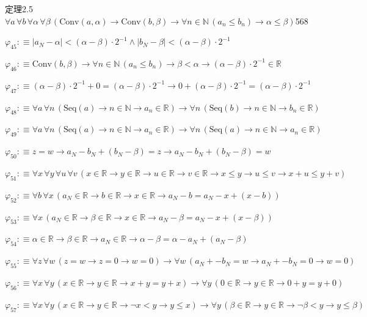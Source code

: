 \begin{fullproof}{定理2.5}{$\forall a\,\forall b\,\forall \alpha\,\forall \beta\,(\mathrm{Conv}(a,\alpha) \to \mathrm{Conv}(b,\beta) \to \forall n \in \mathbb{N}\,(a_{n} \leq b_{n}) \to \alpha \leq \beta)$}{568}
\begin{abbrevlist}
\item $\varphi_{45} :\equiv \lvert a_{N} - \alpha \rvert < (\alpha - \beta) \cdot 2^{-1} \land \lvert b_{N} - \beta \rvert < (\alpha - \beta) \cdot 2^{-1}$
\item $\varphi_{46} :\equiv \mathrm{Conv}(b,\beta) \to \forall n \in \mathbb{N}\,(a_{n} \leq b_{n}) \to \beta < \alpha \to (\alpha - \beta) \cdot 2^{-1} \in \mathbb{R}$
\item $\varphi_{47} :\equiv (\alpha - \beta) \cdot 2^{-1} + 0 = (\alpha - \beta) \cdot 2^{-1} \to 0 + (\alpha - \beta) \cdot 2^{-1} = (\alpha - \beta) \cdot 2^{-1}$
\item $\varphi_{48} :\equiv \forall a\,\forall n\,(\mathrm{Seq}(a) \to n \in \mathbb{N} \to a_{n} \in \mathbb{R}) \to \forall n\,(\mathrm{Seq}(b) \to n \in \mathbb{N} \to b_{n} \in \mathbb{R})$
\item $\varphi_{49} :\equiv \forall a\,\forall n\,(\mathrm{Seq}(a) \to n \in \mathbb{N} \to a_{n} \in \mathbb{R}) \to \forall n\,(\mathrm{Seq}(a) \to n \in \mathbb{N} \to a_{n} \in \mathbb{R})$
\item $\varphi_{50} :\equiv z = w \to a_{N} - b_{N} + (b_{N} - \beta) = z \to a_{N} - b_{N} + (b_{N} - \beta) = w$
\item $\varphi_{51} :\equiv \forall x\,\forall y\,\forall u\,\forall v\,(x \in \mathbb{R} \to y \in \mathbb{R} \to u \in \mathbb{R} \to v \in \mathbb{R} \to x \leq y \to u \leq v \to x + u \leq y + v)$
\item $\varphi_{52} :\equiv \forall b\,\forall x\,(a_{N} \in \mathbb{R} \to b \in \mathbb{R} \to x \in \mathbb{R} \to a_{N} - b = a_{N} - x + (x - b))$
\item $\varphi_{53} :\equiv \forall x\,(a_{N} \in \mathbb{R} \to \beta \in \mathbb{R} \to x \in \mathbb{R} \to a_{N} - \beta = a_{N} - x + (x - \beta))$
\item $\varphi_{54} :\equiv \alpha \in \mathbb{R} \to \beta \in \mathbb{R} \to a_{N} \in \mathbb{R} \to \alpha - \beta = \alpha - a_{N} + (a_{N} - \beta)$
\item $\varphi_{55} :\equiv \forall z\,\forall w\,(z = w \to z = 0 \to w = 0) \to \forall w\,(a_{N} + -b_{N} = w \to a_{N} + -b_{N} = 0 \to w = 0)$
\item $\varphi_{56} :\equiv \forall x\,\forall y\,(x \in \mathbb{R} \to y \in \mathbb{R} \to x + y = y + x) \to \forall y\,(0 \in \mathbb{R} \to y \in \mathbb{R} \to 0 + y = y + 0)$
\item $\varphi_{57} :\equiv \forall x\,\forall y\,(x \in \mathbb{R} \to y \in \mathbb{R} \to \neg x < y \to y \leq x) \to \forall y\,(\beta \in \mathbb{R} \to y \in \mathbb{R} \to \neg \beta < y \to y \leq \beta)$

\end{abbrevlist}
\end{fullproof}
